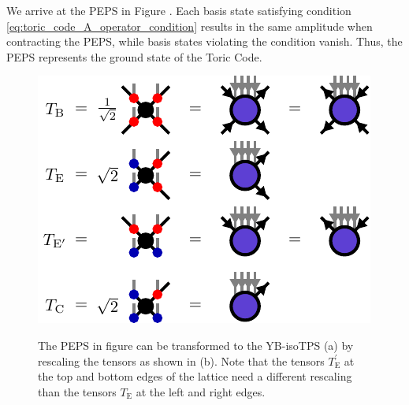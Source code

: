 We arrive at the PEPS in Figure . Each basis state satisfying condition \eqref{eq:toric_code_A_operator_condition} results in the same amplitude when contracting the PEPS, while basis states violating the condition vanish. Thus, the PEPS represents the ground state of the Toric Code. \par
\begin{figure}
	\centering
	\subcaptionbox{\label{fig:toric_code_YB_isoTPS_representation}}
	{%
		\usebox{\largestimage}
	}
	\quad\quad\quad
	\subcaptionbox{\label{fig:toric_code_YB_isoTPS_representation_tensor_definitions}}
	{%
		\raisebox{\dimexpr.5\ht\largestimage-.5\height}
		{%
			\includegraphics[scale=1]{figures/tikz/toric_code/YB_isoTPS_representation/YB_isoTPS_representation_b.pdf}
		}
	}
	\caption{The PEPS in figure \protect{} can be transformed to the YB-isoTPS (a) by rescaling the tensors as shown in (b). Note that the tensors $T_\text{E}^\prime$ at the top and bottom edges of the lattice need a different rescaling than the tensors $T_\text{E}$ at the left and right edges.}
	\label{fig:toric_code_YB_isoTPS}
\end{figure}
